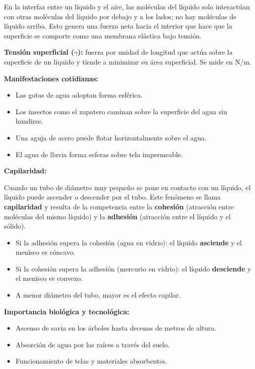 \begin{seccion}
En la interfaz entre un líquido y el aire, las moléculas del líquido solo interactúan con otras moléculas del líquido por debajo y a los lados; no hay moléculas de líquido arriba. Esto genera una fuerza neta hacia el interior que hace que la superficie se comporte como una membrana elástica bajo tensión.

\begin{definicion}
\textbf{Tensión superficial ($\gamma$):} fuerza por unidad de longitud que actúa sobre la superficie de un líquido y tiende a minimizar su área superficial. Se mide en N/m.
\end{definicion}

\textbf{Manifestaciones cotidianas:}
\begin{itemize}
    \item Las gotas de agua adoptan forma esférica.
    \item Los insectos como el zapatero caminan sobre la superficie del agua sin hundirse.
    \item Una aguja de acero puede flotar horizontalmente sobre el agua.
    \item El agua de lluvia forma esferas sobre tela impermeable.
\end{itemize}

\vspace{0.3cm}

\textbf{Capilaridad:}

Cuando un tubo de diámetro muy pequeño se pone en contacto con un líquido, el líquido puede ascender o descender por el tubo. Este fenómeno se llama \textbf{capilaridad} y resulta de la competencia entre la \textbf{cohesión} (atracción entre moléculas del mismo líquido) y la \textbf{adhesión} (atracción entre el líquido y el sólido).

\begin{itemize}
    \item Si la adhesión supera la cohesión (agua en vidrio): el líquido \textbf{asciende} y el menisco es cóncavo.
    \item Si la cohesión supera la adhesión (mercurio en vidrio): el líquido \textbf{desciende} y el menisco es convexo.
    \item A menor diámetro del tubo, mayor es el efecto capilar.
\end{itemize}

\textbf{Importancia biológica y tecnológica:}
\begin{itemize}
    \item Ascenso de savia en los árboles hasta decenas de metros de altura.
    \item Absorción de agua por las raíces a través del suelo.
    \item Funcionamiento de telas y materiales absorbentes.
\end{itemize}
\end{seccion}

